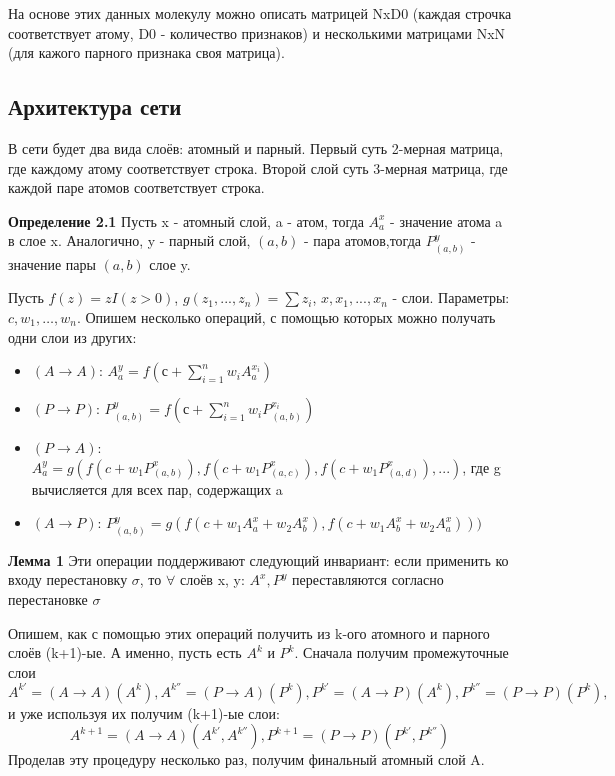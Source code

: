 \documentclass[12pt,twoside]{article}
\begin{document}
На основе этих данных молекулу можно описать матрицей NxD0 (каждая строчка соответствует атому, D0 - количество признаков) и несколькими матрицами NxN (для кажого парного признака своя матрица).

\subsection{Архитектура сети}
	В сети будет два вида слоёв: атомный и парный. Первый суть 2-мерная матрица, где каждому атому соответствует строка. Второй слой суть 3-мерная матрица, где каждой паре атомов соответствует строка.
	
	\textbf{Определение 2.1} Пусть x - атомный слой, a - атом, тогда $A^x_a$ - значение атома a в слое x. Аналогично, y - парный слой, $(a, b)$ - пара атомов,тогда $P^y_{(a, b)}$ - значение пары $(a, b)$ слое y.
	
	Пусть $f(z) = z I(z > 0)$, $g(z_1,..., z_n) = \sum{z_i}$, $x, x_1,...,x_n$ - слои. Параметры: $c, w_1,\dots,w_n$. Опишем несколько операций, с помощью которых можно получать одни слои из других:
	\begin{itemize}
	\item $(A\rightarrow A)$: $A^y_a = f(с+\sum_{i=1}^n {w_i A^{x_i}_a})$
	\item $(P\rightarrow P)$: $P^y_{(a, b)} = f(с+\sum_{i=1}^n {w_i P^{x_i}_{(a, b)}})$
	\item $(P\rightarrow A)$: $A^y_a = g(f(c + w_1 P^x_{(a, b)}), f(c + w_1 P^x_{(a, c)}), f(c + w_1 P^x_{(a, d)}),...)$, где g вычисляется для всех пар, содержащих a
	\item $(A\rightarrow P)$: $P^y_{(a, b)} = g(f(c + w_1 A^x_a + w_2 A^x_b), f(c + w_1 A^x_b + w_2 A^x_a)))$
	\end{itemize}
	
	\textbf{Лемма 1} Эти операции поддерживают следующий инвариант: если применить ко входу перестановку $\sigma$, то $\forall$ слоёв x, y: $A^x, P^y$ переставляются согласно перестановке $\sigma$
	
	Опишем, как с помощью этих операций получить из k-ого атомного и парного слоёв (k+1)-ые. А именно, пусть есть $A^k$ и $P^k$. Сначала получим промежуточные слои $$A^{k'} = (A\rightarrow A)(A^k), A^{k''}=(P\rightarrow A)(P^k), P^{k'}=(A \rightarrow P)(A^k), P^{k''}=(P\rightarrow P)(P^k),$$ и уже используя их получим (k+1)-ые слои: $$A^{k+1} = (A\rightarrow A)(A^{k'}, A^{k''}), P^{k+1} = (P\rightarrow P)(P^{k'}, P^{k''})$$
Проделав эту процедуру несколько раз, получим финальный атомный слой A.
\end{document}
